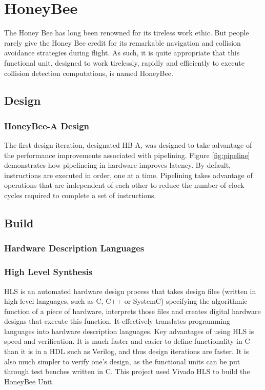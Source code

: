 \newpage
\section{HoneyBee}
    The Honey Bee has long been renowned for its tireless work ethic. But people rarely give the Honey Bee credit for its remarkable navigation and collision avoidance strategies during flight. As such, it is quite appropriate that this functional unit, designed to work tirelessly, rapidly and efficiently to execute collision detection computations, is named HoneyBee. \\


    \subsection{Design}
        \subsubsection*{HoneyBee-A Design}
        The first design iteration, designated \ac{HB-A}, was designed to take advantage of the performance improvements associated with pipelining. Figure \ref{fig:pipeline} demonstrates how pipelineing in hardware improves latency. By default, instructions are executed in order, one at a time. Pipelining takes advantage of operations that are independent of each other to reduce the number of clock cycles required to complete a set of instructions. 
        
 

    \subsection{Build}
        \subsubsection*{Hardware Description Languages}

        \subsubsection*{High Level Synthesis}
        \ac{HLS} is an automated hardware design process that takes design files (written in high-level languages, such as C, C++ or SystemC) specifying the algorithmic function of a piece of hardware, interprets those files and creates digital hardware designs that execute this function. It effectively translates programming languages into hardware description languages. Key advantages of using HLS is speed and verification. It is much faster and easier to define functionality in C than it is in a \ac{HDL} such as Verilog, and thus design iterations are faster. It is also much simpler to verify one's design, as the functional units can be put through test benches written in C. This project used Vivado HLS to build the HoneyBee Unit.

